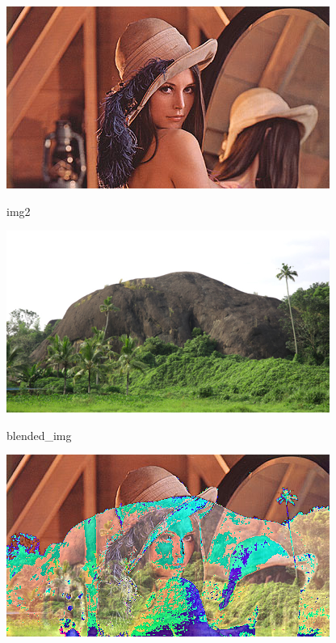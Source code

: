 \documentclass[
  letterpaper,
  DIV=11,
  numbers=noendperiod]{scrreprt}
\newenvironment{Shaded}{\begin{snugshade}}{\end{snugshade}}
\newcommand{\NormalTok}[1]{\textcolor[rgb]{0.00,0.23,0.31}{#1}}
\theoremstyle{plain}
\theoremstyle{definition}
\theoremstyle{remark}
\begin{document}
\includegraphics{module_1_files/figure-pdf/cell-9-output-1.png}

\begin{Shaded}
\begin{Highlighting}[]
\NormalTok{img2}
\end{Highlighting}
\end{Shaded}

\includegraphics{module_1_files/figure-pdf/cell-10-output-1.png}

\begin{Shaded}
\begin{Highlighting}[]
\NormalTok{blended\_img}
\end{Highlighting}
\end{Shaded}

\includegraphics{module_1_files/figure-pdf/cell-11-output-1.png}
\end{document}
